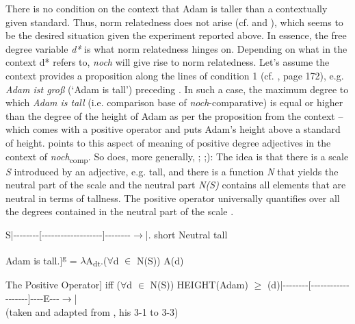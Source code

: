 \documentclass[output=paper
,modfonts
,nonflat]{langsci/langscibook}
\begin{document}
\noindent There is no condition on the context that Adam is taller than a contextually given standard. Thus, norm relatedness does not arise (cf. \citealt{umbach2009a_comp} and ), which seems to be the desired situation given the experiment reported above. In essence, the free degree variable \textit{d*} is what norm relatedness hinges on. Depending on what in the context d* refers to, \textit{noch} will give rise to norm relatedness. Let's assume the context provides a proposition along the lines of condition 1 (cf. , page 172), e.g. \textit{Adam ist groß} (`Adam is tall') preceding . In such a case, the maximum degree to which \textit{Adam is tall} (i.e. comparison base of \textit{noch}-comparative) is equal or higher than the degree of the height of Adam as per the proposition from the context -- which comes with a positive operator and puts Adam's height above a standard of height. \citeauthor{umbach2009a_comp} \citeyearpar{umbach2009a_comp} points to this aspect of meaning of positive degree adjectives in the context of \textit{noch}\textsubscript{comp}. So does, more generally, \citeauthor{stechow2006} \citeyearpar{stechow2006}; \citep{stechow1984};\citep{Beck2011}): The idea is that there is a scale \textit{S} introduced by an adjective, e.g. tall, and there is a function \textit{N} that yields the neutral part of the scale and the neutral part \textit{N(S)} contains all elements that are neutral in terms of tallness. The positive operator universally quantifies over all the degrees contained in the neutral part of the scale \citet{stechow2006}.

\ea S\hspace{15pt}|{-}{-}{-}{-}{-}{-}{-}{-}{[}{-}{-}{-}{-}{-}{-}{-}{-}{-}{-}{-}{-}{-}{-}{-}{-}{-}{-}{-}{]}{-}{-}{-}{-}{-}{-}{-}{-}$\to$|\newline .\hspace{22pt} short \hspace{20pt} Neutral \hspace{25pt} tall\z

\ea Adam is tall.\newline [[\textbf{Pos}\textsubscript{N,S}]]\textsuperscript{g} = $\lambda$A\textsubscript{dt}.(\textbf{$\forall$}d $\in$ N(S)) A(d) \z

\ea The Positive Operator\newline [[\textbf{Pos}\textsubscript{N,S}$\lambda$d.tall\textsubscript{S}(d)(Adam)]] iff ($\forall$d $\in$ N(S)) HEIGHT(Adam) $\geq$ (d)\newline|{-}{-}{-}{-}{-}{-}{-}{-}{[}{-}{-}{-}{-}{-}{-}{-}{-}{-}{-}{-}{-}{-}{-}{-}{-}{-}{-}{-}{]}{-}{-}{-}{-}{E}{-}{-}{-}$\to$| \\ (taken and adapted from \citeauthor{stechow2006} \citealt{stechow2006}, his 3-1 to 3-3)\z
\end{document}
